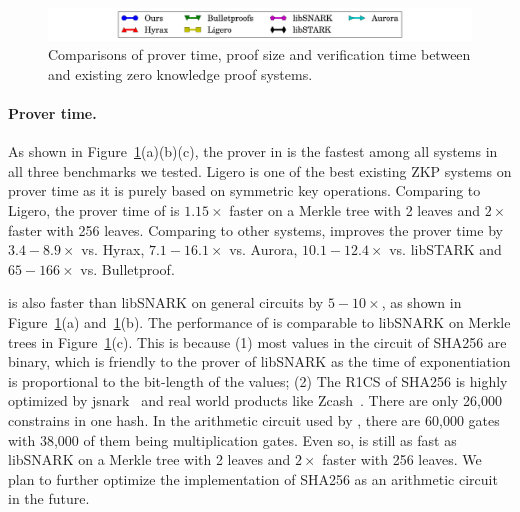 \begin{figure}[t!]
{	%
}%
%
\quad

\centering
\includegraphics[width = 6in]{legend.pdf}%
\caption{\label{fig:Allcom}Comparisons of prover time, proof size and verification time between \name{} and existing zero knowledge proof systems.}
\end{figure}


\paragraph{Prover time.} As shown in Figure~\ref{fig:Allcom}(a)(b)(c), the prover in \name is the fastest among all systems in all three benchmarks we tested. \textsf{Ligero} is one of the best existing ZKP systems on prover time as it is purely based on symmetric key operations. Comparing to \textsf{Ligero}, the prover time of \name is $1.15\times$ faster on a Merkle tree with 2 leaves and $2\times$ faster with 256 leaves. Comparing to other systems, \name improves the prover time by $3.4-8.9\times$ vs. \textsf{Hyrax}, $7.1-16.1\times$ vs. \textsf{Aurora}, $10.1-12.4\times$ vs. \textsf{libSTARK} and $65-166\times$ vs. \textsf{Bulletproof}. 

\name is also faster than \textsf{libSNARK} on general circuits by $5-10\times$, as shown in Figure~\ref{fig:Allcom}(a) and~\ref{fig:Allcom}(b). The performance of \name is comparable to \textsf{libSNARK} on Merkle trees in Figure~\ref{fig:Allcom}(c). This is because (1) most values in the circuit of SHA256 are binary, which is friendly to the prover of \textsf{libSNARK} as the time of exponentiation is proportional to the bit-length of the values; (2) The R1CS of SHA256 is highly optimized by jsnark~\cite{jsnark} and real world products like Zcash~\cite{zerocash}. There are only 26,000 constrains in one hash. In the arithmetic circuit used by \name, there are 60,000 gates with 38,000 of them being multiplication gates. Even so, \name is still as fast as \textsf{libSNARK} on a Merkle tree with 2 leaves and $2\times$ faster with 256 leaves. We plan to further optimize the implementation of SHA256 as an arithmetic circuit in the future.


